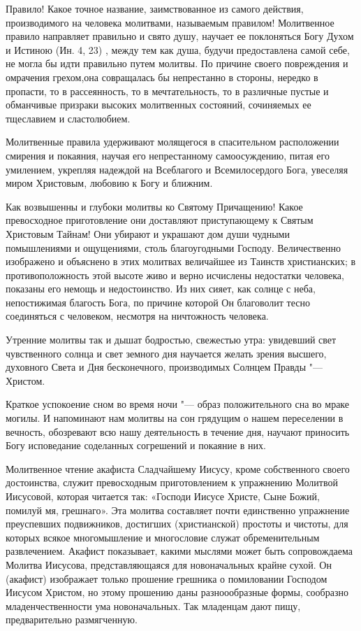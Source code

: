 Правило! Какое точное название, заимствованное из самого действия, производимого на человека молитвами, называемым правилом! Молитвенное правило направляет правильно и свято душу, научает ее поклоняться Богу Духом и Истиною (Ин. 4, 23) , между тем как душа, будучи предоставлена самой себе, не могла бы идти правильно путем молитвы. По причине своего повреждения и омрачения грехом,она совращалась бы непрестанно в стороны, нередко в пропасти, то в рассеянность, то в мечтательность, то в различные пустые и обманчивые призраки высоких молитвенных состояний, сочиняемых ее тщеславием и сластолюбием.

Молитвенные правила удерживают молящегося в спасительном расположении смирения и покаяния, научая его непрестанному самоосуждению, питая его умилением, укрепляя надеждой на Всеблагого и Всемилосердого Бога, увеселяя миром Христовым, любовию к Богу и ближним.

Как возвышенны и глубоки молитвы ко Святому Причащению! Какое превосходное приготовление они доставляют приступающему к Святым Христовым Тайнам! Они убирают и украшают дом души чудными помышлениями и ощущениями, столь благоугодными Господу. Величественно изображено и объяснено в этих молитвах величайшее из Таинств христианских; в противоположность этой высоте живо и верно исчислены недостатки человека, показаны его немощь и недостоинство. Из них сияет, как солнце с неба, непостижимая благость Бога, по причине которой Он благоволит тесно соединяться с человеком, несмотря на ничтожность человека.

Утренние молитвы так и дышат бодростью, свежестью утра: увидевший свет чувственного солнца и свет земного дня научается желать зрения высшего, духовного Света и Дня бесконечного, производимых Солнцем Правды "--- Христом.

Краткое успокоение сном во время ночи "--- образ положительного сна во мраке могилы. И напоминают нам молитвы на сон грядущим о нашем переселении в вечность, обозревают всю нашу деятельность в течение дня, научают приносить Богу исповедание соделанных согрешений и покаяние в них.

Молитвенное чтение акафиста Сладчайшему Иисусу, кроме собственного своего достоинства, служит превосходным приготовлением к упражнению Молитвой Иисусовой, которая читается так: «Господи Иисусе Христе, Сыне Божий, помилуй мя, грешнаго». Эта молитва составляет почти единственно упражнение преуспевших подвижников, достигших (христианской) простоты и чистоты, для которых всякое многомышление и многословие служат обременительным развлечением. Акафист показывает, какими мыслями может быть сопровождаема Молитва Иисусова, представляющаяся для новоначальных крайне сухой. Он (акафист) изображает только прошение грешника о помиловании Господом Иисусом Христом, но этому прошению даны разноообразные формы, сообразно младенчественности ума новоначальных. Так младенцам дают пищу, предварительно размягченную.

